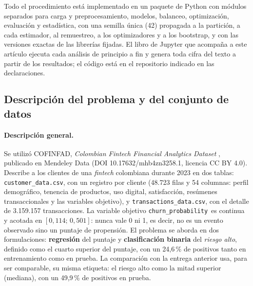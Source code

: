 \documentclass[pdflatex,sn-mathphys-num]{sn-jnl}
\newcommand{\cp}{\texttt{churn\_probability}}
\begin{document}
Todo el procedimiento está implementado en un paquete de Python con módulos separados para carga y preprocesamiento, modelos, balanceo, optimización, evaluación y estadística, con una semilla única (42) propagada a la partición, a cada estimador, al remuestreo, a los optimizadores y a los bootstrap, y con las versiones exactas de las librerías fijadas. El libro de Jupyter que acompaña a este artículo ejecuta cada análisis de principio a fin y genera toda cifra del texto a partir de los resultados; el código está en el repositorio indicado en las declaraciones.

\subsection{Descripción del problema y del conjunto de datos}\label{sec:datos}

\paragraph{Descripción general.}
Se utilizó COFINFAD, \textit{Colombian Fintech Financial Analytics Dataset} \cite{cofinfad2025}, publicado en Mendeley Data (DOI 10.17632/mhb4zn3258.1, licencia CC BY 4.0). Describe a los clientes de una \textit{fintech} colombiana durante 2023 en dos tablas: \texttt{customer\_data.csv}, con un registro por cliente (48.723 filas y 54 columnas: perfil demográfico, tenencia de productos, uso digital, satisfacción, resúmenes transaccionales y las variables objetivo), y \texttt{transactions\_data.csv}, con el detalle de 3.159.157 transacciones. La variable objetivo \cp\ es continua y acotada en $[0{,}114;\,0{,}501]$: nunca vale 0 ni 1, es decir, no es un evento observado sino un puntaje de propensión. El problema se aborda en dos formulaciones: \textbf{regresión} del puntaje y \textbf{clasificación binaria} del \emph{riesgo alto}, definido como el cuarto superior del puntaje, con un 24,6\,\% de positivos tanto en entrenamiento como en prueba. La comparación con la entrega anterior usa, para ser comparable, su misma etiqueta: el riesgo alto como la mitad superior (mediana), con un 49,9\,\% de positivos en prueba.
\end{document}

